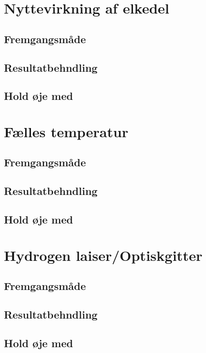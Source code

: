 \section{Nyttevirkning af elkedel}
\subsection{Fremgangsmåde}

\subsection{Resultatbehndling}

\subsection{Hold øje med}

\section{Fælles temperatur}
\subsection{Fremgangsmåde}

\subsection{Resultatbehndling}

\subsection{Hold øje med}

\section{Hydrogen laiser/Optiskgitter}
\subsection{Fremgangsmåde}

\subsection{Resultatbehndling}

\subsection{Hold øje med}

